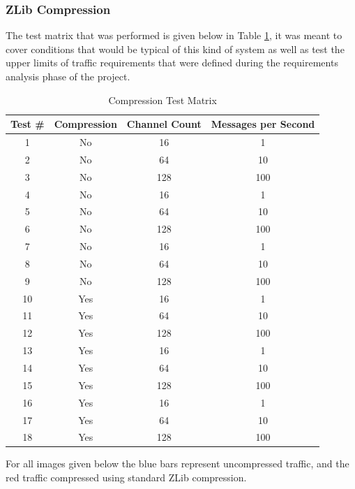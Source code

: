     \newpage
    \subsubsection{ZLib Compression}\label{sec:results-research-zlib}

      The test matrix that was performed is given below in Table
      \ref{tab:zlib-tests}, it was meant to cover conditions that would be
      typical of this kind of system as well as test the upper limits of
      traffic requirements that were defined during the requirements analysis
      phase of the project.

      \begin{table}[H]
        \centering
        \begin{tabular}{c c c c}
          \toprule
          Test \# & Compression & Channel Count & Messages per Second \\ [0.5ex]
          \midrule
           1 & No  & 16  &   1 \\
           2 & No  & 64  &  10 \\
           3 & No  & 128 & 100 \\
           4 & No  & 16  &   1 \\
           5 & No  & 64  &  10 \\
           6 & No  & 128 & 100 \\
           7 & No  & 16  &   1 \\
           8 & No  & 64  &  10 \\
           9 & No  & 128 & 100 \\
          10 & Yes & 16  &   1 \\
          11 & Yes & 64  &  10 \\
          12 & Yes & 128 & 100 \\
          13 & Yes & 16  &   1 \\
          14 & Yes & 64  &  10 \\
          15 & Yes & 128 & 100 \\
          16 & Yes & 16  &   1 \\
          17 & Yes & 64  &  10 \\
          18 & Yes & 128 & 100 \\
          \bottomrule
        \end{tabular}
        \caption{Compression Test Matrix}\label{tab:zlib-tests}
      \end{table}

      For all images given below the blue bars represent uncompressed traffic, and
      the red traffic compressed using standard ZLib compression.

